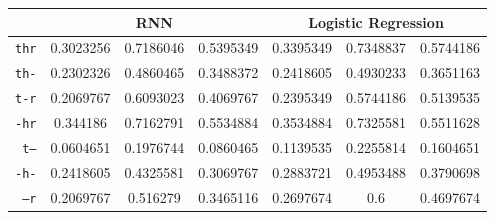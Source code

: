 \documentclass[../main.tex]{subfiles}
\begin{document}
\begin{table}[ht]
\begin{small}
\begin{tabular}{|r|c|c|c|c|c|c|}
		\hline
		 & \multicolumn{3}{|c|}{\textbf{RNN}} & \multicolumn{3}{|c|}{\textbf{Logistic Regression}} \\
		\hline
		\texttt{thr} & 0.3023256 & 0.7186046 & 0.5395349 & 0.3395349 & 0.7348837 & 0.5744186 \\
		\texttt{th-} & 0.2302326 & 0.4860465 & 0.3488372 & 0.2418605 & 0.4930233 & 0.3651163 \\
		\texttt{t-r} & 0.2069767 & 0.6093023 & 0.4069767 & 0.2395349 & 0.5744186 & 0.5139535 \\
		\texttt{-hr} & 0.344186 & 0.7162791 & 0.5534884 & 0.3534884 & 0.7325581 & 0.5511628 \\
		\texttt{t--} & 0.0604651 & 0.1976744 & 0.0860465 & 0.1139535 & 0.2255814 & 0.1604651 \\
		\texttt{-h-} & 0.2418605 & 0.4325581 & 0.3069767 & 0.2883721 & 0.4953488 & 0.3790698 \\
		\texttt{--r} & 0.2069767 & 0.516279 & 0.3465116 & 0.2697674 & 0.6 & 0.4697674 \\
		\hline
	\end{tabular}
	\end{small}
\end{table}
\end{document}
